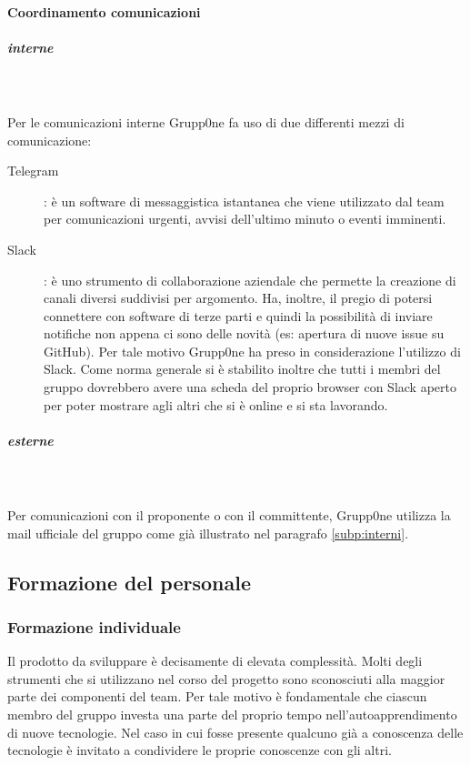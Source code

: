 \documentclass[../norme-di-progetto.tex]{subfiles}
\begin{document}
\paragraph{Coordinamento comunicazioni}
\label{par:coordinamento comunicazioni}
\subparagraph{interne}\mbox{}\\
\label{subp:interne}
\\Per le comunicazioni interne Grupp0ne fa uso di due differenti mezzi di comunicazione:
\begin{description}
  \item [Telegram]: è un software di messaggistica istantanea che viene utilizzato dal team per comunicazioni urgenti, avvisi dell'ultimo minuto o eventi imminenti.
  \item [Slack]: è uno strumento di collaborazione aziendale che permette la creazione di canali diversi suddivisi per argomento. Ha, inoltre, il pregio di potersi connettere con software di terze parti e quindi la possibilità di inviare notifiche non appena ci sono delle novità (es: apertura di nuove issue su GitHub). Per tale motivo Grupp0ne ha preso in considerazione l'utilizzo di Slack. Come norma generale si è stabilito inoltre che tutti i membri del gruppo dovrebbero avere una scheda del proprio browser con Slack aperto per poter mostrare agli altri che si è online e si sta lavorando.
\end{description}
\subparagraph{esterne}\mbox{}\\
\label{subp:esterne}
\\Per comunicazioni con il proponente o con il committente, Grupp0ne utilizza la mail ufficiale del gruppo come già illustrato nel paragrafo \ref{subp:interni}.

\subsection{Formazione del personale}%
\label{sub:formazione del personale}

\subsubsection{Formazione individuale}%
\label{subs:formazione individuale}

Il prodotto da sviluppare è decisamente di elevata complessità.
Molti degli strumenti che si utilizzano nel corso del progetto sono sconosciuti alla maggior parte dei componenti del team.
Per tale motivo è fondamentale che ciascun membro del gruppo investa una parte del proprio tempo nell'autoapprendimento di nuove tecnologie.
Nel caso in cui fosse presente qualcuno già a conoscenza delle tecnologie è invitato a condividere le proprie conoscenze con gli altri.
\end{document}
